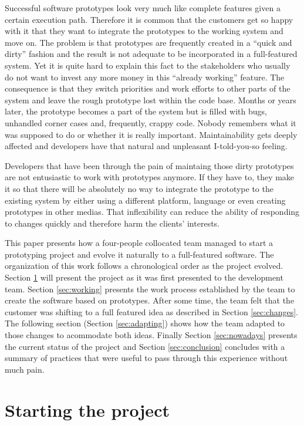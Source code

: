 \documentclass[lnbip]{svmultln}
\begin{document}
Successful software prototypes look very much like complete features
given a certain execution path. Therefore it is common that the
customers get so happy with it that they want to integrate the
prototypes to the working system and move on. The problem is that
prototypes are frequently created in a ``quick and dirty'' fashion and
the result is not adequate to be incorporated in a full-featured
system. Yet it is quite hard to explain this fact to the stakeholders
who usually do not want to invest any more money in this ``already
working'' feature. The consequence is that they switch priorities and
work efforts to other parts of the system and leave the rough
prototype lost within the code base. Months or years later, the
prototype becomes a part of the system but is filled with bugs,
unhandled corner cases and, frequently, crappy code. Nobody remembers
what it was supposed to do or whether it is really
important. Maintainability gets deeply affected and developers have
that natural and unpleasant I-told-you-so feeling. %

Developers that have been through the pain of maintaing those dirty
prototypes are not entusiastic to work with prototypes anymore. If
they have to, they make it so that there will be absolutely no way to
integrate the prototype to the existing system by either using a
different platform, language or even creating prototypes in other
medias. That inflexibility can reduce the ability of responding to
changes quickly and therefore harm the clients' interests.

This paper presents how a four-people collocated team managed to start
a prototyping project and evolve it naturally to a full-featured
software. The organization of this work follows a chronological order
as the project evolved. Section \ref{sec:start} will present the
project as it was first presented to the development team. Section
\ref{sec:working} presents the work process established by the team to
create the software based on prototypes.  After some time, the team
felt that the customer was shifting to a full featured idea as
described in Section \ref{sec:changes}. The following section (Section
\ref{sec:adapting}) shows how the team adapted to those changes to
acommodate both ideas. Finally Section \ref{sec:nowadays} presents the
current status of the project and Section \ref{sec:conclusion}
concludes with a summary of practices that were useful to pass through
this experience without much pain.

\section{Starting the project}
\label{sec:start}
\end{document}
